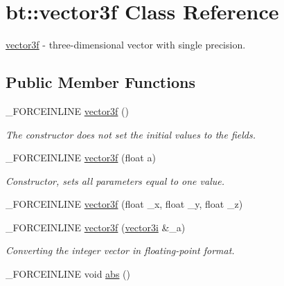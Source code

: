 \hypertarget{classbt_1_1vector3f}{\section{bt\-:\-:vector3f Class Reference}
\label{classbt_1_1vector3f}
}


\hyperlink{classbt_1_1vector3f}{vector3f} -\/ three-\/dimensional vector with single precision.  


\subsection*{Public Member Functions}
\begin{DoxyCompactItemize}
\item 
\hypertarget{classbt_1_1vector3f_a8c1b66f5cf148ca863bf42d27d01ccc3}{\-\_\-\-F\-O\-R\-C\-E\-I\-N\-L\-I\-N\-E \hyperlink{classbt_1_1vector3f_a8c1b66f5cf148ca863bf42d27d01ccc3}{vector3f} ()}\label{classbt_1_1vector3f_a8c1b66f5cf148ca863bf42d27d01ccc3}

\begin{DoxyCompactList}\small\item\em The constructor does not set the initial values to the fields. \end{DoxyCompactList}\item 
\hypertarget{classbt_1_1vector3f_aadd877bbec128d0e16f8f95560dc58f5}{\-\_\-\-F\-O\-R\-C\-E\-I\-N\-L\-I\-N\-E \hyperlink{classbt_1_1vector3f_aadd877bbec128d0e16f8f95560dc58f5}{vector3f} (float a)}\label{classbt_1_1vector3f_aadd877bbec128d0e16f8f95560dc58f5}

\begin{DoxyCompactList}\small\item\em Constructor, sets all parameters equal to one value. \end{DoxyCompactList}\item 
\-\_\-\-F\-O\-R\-C\-E\-I\-N\-L\-I\-N\-E \hyperlink{classbt_1_1vector3f_ac2fa93f808b19fed715015e2ba0adbca}{vector3f} (float \-\_\-x, float \-\_\-y, float \-\_\-z)
\item 
\hypertarget{classbt_1_1vector3f_a223953e1fc2b7e9b66a0c2576157b89b}{\-\_\-\-F\-O\-R\-C\-E\-I\-N\-L\-I\-N\-E \hyperlink{classbt_1_1vector3f_a223953e1fc2b7e9b66a0c2576157b89b}{vector3f} (\hyperlink{classbt_1_1vector3i}{vector3i} \&\-\_\-a)}\label{classbt_1_1vector3f_a223953e1fc2b7e9b66a0c2576157b89b}

\begin{DoxyCompactList}\small\item\em Converting the integer vector in floating-\/point format. \end{DoxyCompactList}\item 
\hypertarget{classbt_1_1vector3f_a396173a14126f3b6ccd80e738d057d1d}{\-\_\-\-F\-O\-R\-C\-E\-I\-N\-L\-I\-N\-E void \hyperlink{classbt_1_1vector3f_a396173a14126f3b6ccd80e738d057d1d}{abs} ()}\label{classbt_1_1vector3f_a396173a14126f3b6ccd80e738d057d1d}


\end{DoxyCompactItemize}
